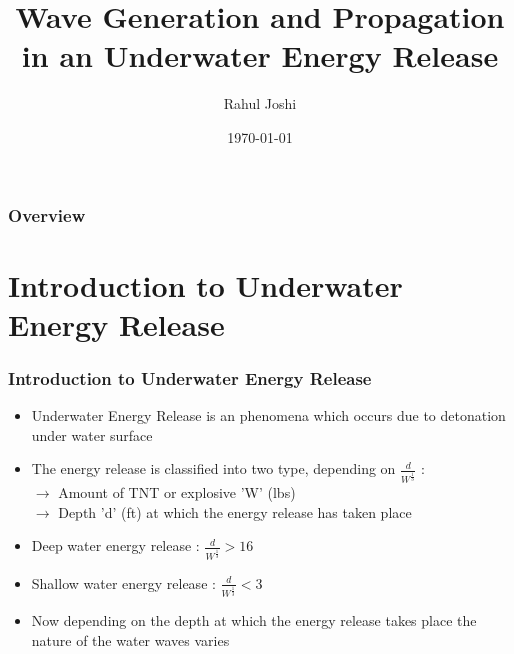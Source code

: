 \documentclass{beamer}
\title[]{Wave Generation and Propagation in an Underwater Energy Release} %
\author{Rahul Joshi} %
\institute[IIT, Bombay] %
{
Under the Guidance of \\ Prof. Shivasubramanian Gopalakrishnan \\\vspace{0.2cm}Department of Mechanical Engineering \\ Indian Institute of Technology, Bombay%
\medskip
}
\date{\today} %
\begin{document}
\begin{frame}
\titlepage %
\end{frame}

\begin{frame}
\frametitle{Overview} %
\tableofcontents %
\end{frame}

\section{Introduction to Underwater Energy Release}

\begin{frame}
\frametitle{Introduction to Underwater Energy Release}
\begin{itemize}
  \item Underwater Energy Release is an phenomena which occurs due to detonation under water surface 
  \item The energy release is classified into two type, depending on \textbf{$\frac{d}{W^\frac{1}{3}}$ }: \\
  $\rightarrow$ Amount of TNT or explosive 'W' (lbs) \\
  $\rightarrow$ Depth 'd' (ft) at which the energy release has taken place
  \item Deep water energy release : $\frac{d}{W^\frac{1}{3}} > 16$  
  \item Shallow water energy release : $\frac{d}{W^\frac{1}{3}} < 3$ 
  \item Now depending on the depth at which the energy release takes place the nature of the water waves varies
\end{itemize}

\end{frame}
\end{document}

